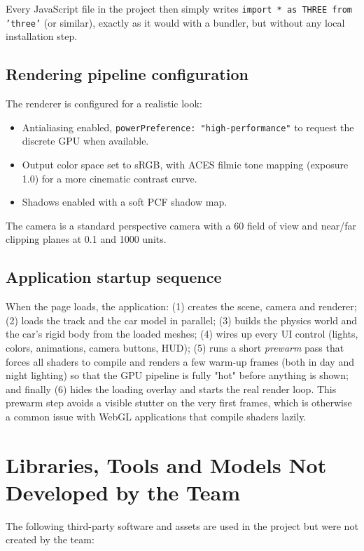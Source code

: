 \documentclass[11pt]{article}
\begin{document}
Every JavaScript file in the project then simply writes
\texttt{import * as THREE from 'three'} (or similar), exactly as it would
with a bundler, but without any local installation step.

\subsection{Rendering pipeline configuration}
The renderer is configured for a realistic look:
\begin{itemize}
    \item Antialiasing enabled, \texttt{powerPreference: "high-performance"}
    to request the discrete GPU when available.
    \item Output color space set to sRGB, with ACES filmic tone mapping
    (exposure 1.0) for a more cinematic contrast curve.
    \item Shadows enabled with a soft PCF shadow map.
\end{itemize}
The camera is a standard perspective camera with a 60\textdegree{} field of
view and near/far clipping planes at 0.1 and 1000 units.

\subsection{Application startup sequence}
When the page loads, the application: (1) creates the scene, camera and
renderer; (2) loads the track and the car model in parallel; (3) builds the
physics world and the car's rigid body from the loaded meshes; (4) wires up
every UI control (lights, colors, animations, camera buttons, HUD); (5)
runs a short \emph{prewarm} pass that forces all shaders to compile and
renders a few warm-up frames (both in day and night lighting) so that the
GPU pipeline is fully "hot" before anything is shown; and finally (6) hides
the loading overlay and starts the real render loop. This prewarm step
avoids a visible stutter on the very first frames, which is otherwise a
common issue with WebGL applications that compile shaders lazily.

\section{Libraries, Tools and Models Not Developed by the Team}

The following third-party software and assets are used in the project but
were not created by the team:
\end{document}

